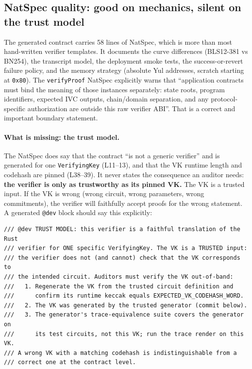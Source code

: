 \subsection{NatSpec quality: good on mechanics, silent on the trust model}
\label{sec:pr-natspec}

The generated contract carries 58 lines of NatSpec, which is more
than most hand-written verifier templates. It documents the curve
differences (BLS12-381 vs BN254), the transcript model, the
deployment smoke tests, the success-or-revert failure policy, and
the memory strategy (absolute Yul addresses, scratch starting at
\texttt{0x80}). The \texttt{verifyProof} NatSpec explicitly warns
that ``application contracts must bind the meaning of those
instances separately: state roots, program identifiers, expected
IVC outputs, chain/domain separation, and any protocol-specific
authorization are outside this raw verifier ABI''. That is a
correct and important boundary statement.

\paragraph{What is missing: the trust model.} 
The NatSpec does say that the contract ``is not a generic
verifier'' and is generated for one
\texttt{VerifyingKey} (L11--13), and that the VK runtime length and
codehash are pinned (L38--39). It never states the consequence an
auditor needs: \textbf{the verifier is only as trustworthy as its
pinned VK.} The VK is a trusted input. If the VK is wrong (wrong
circuit, wrong parameters, wrong commitments), the verifier will
faithfully accept proofs for the wrong statement. A generated
\texttt{@dev} block should say this explicitly:

\begin{lstlisting}[style=plain]
/// @dev TRUST MODEL: this verifier is a faithful translation of the Rust
/// verifier for ONE specific VerifyingKey. The VK is a TRUSTED input:
/// the verifier does not (and cannot) check that the VK corresponds to
/// the intended circuit. Auditors must verify the VK out-of-band:
///   1. Regenerate the VK from the trusted circuit definition and
///      confirm its runtime keccak equals EXPECTED_VK_CODEHASH_WORD.
///   2. The VK was generated by the trusted generator (commit below).
///   3. The generator's trace-equivalence suite covers the generator on
///      its test circuits, not this VK; run the trace render on this VK.
/// A wrong VK with a matching codehash is indistinguishable from a
/// correct one at the contract level.
\end{lstlisting}

